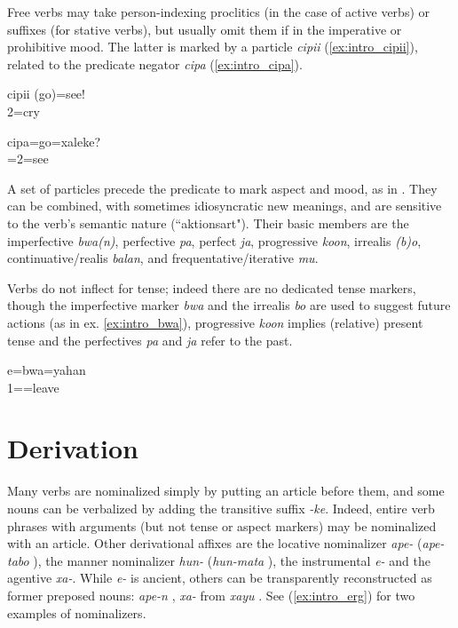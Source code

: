 Free verbs may take person-indexing proclitics (in the case of active verbs) or suffixes (for stative verbs), but usually omit them if in the imperative or prohibitive mood. The latter is marked by a particle \textit{cipii} (\ref{ex:intro_cipii}), related to the predicate negator \textit{cipa} (\ref{ex:intro_cipa}).



\ea\label{ex:intro_cipii}
\gll cipii (go)=see!\\
  2=cry\\
\glt {}
\z

	
\ea\label{ex:intro_cipa}
\gll cipa=go=xaleke?\\
 =2=see\\
\glt {}
\z


A set of particles precede the predicate to mark aspect and mood, as in . They can be combined, with sometimes idiosyncratic new meanings, and are sensitive to the verb's semantic nature (``aktionsart").
Their basic members are the imperfective \textit{bwa(n)}, perfective \textit{pa}, perfect \textit{ja}, progressive \textit{koon}, irrealis \textit{(b)o}, continuative\slash realis \textit{balan}, and frequentative\slash iterative \textit{mu}.

Verbs do not inflect for tense; indeed there are no dedicated tense markers, though the imperfective marker \textit{bwa} and the irrealis \textit{bo} are  used to suggest future actions (as in ex. \ref{ex:intro_bwa}), progressive \textit{koon} implies (relative) present tense and the perfectives \textit{pa} and \textit{ja} refer to the past. 

\ea \label{ex:intro_bwa}
\gll e=bwa=yahan\\
 1==leave\\
\glt {}
\z


\section{Derivation}

Many verbs are nominalized simply by putting an article before them, and some nouns can be verbalized by adding the transitive suffix \textit{-ke}. Indeed, entire verb phrases with arguments (but not tense or aspect markers) may be nominalized with an article. Other derivational affixes are the locative nominalizer \textit{ape-} (\textit{ape-tabo} ), the manner nominalizer \textit{hun-} (\textit{hun-mata} ), the instrumental \textit{e-} and the agentive \textit{xa-}. While \textit{e-} is ancient, others can be transparently reconstructed as former preposed nouns: \textit{ape-n} , \textit{xa-} from \textit{xayu} . See (\ref{ex:intro_erg}) for two examples of nominalizers. 

